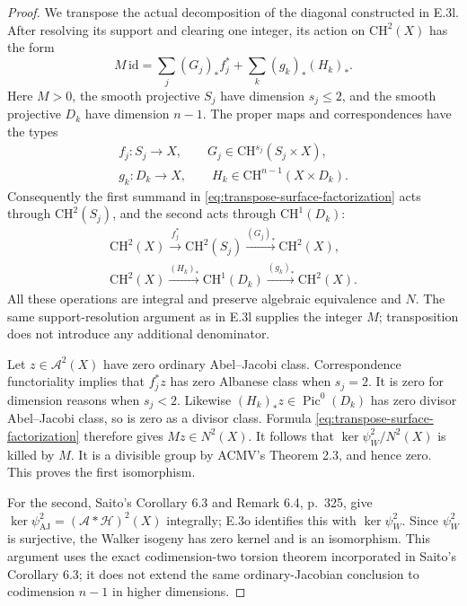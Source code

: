 \begin{proof}
We transpose the actual decomposition of the diagonal
constructed in E.3l. After resolving its support and clearing
one integer, its action on $\mathrm{CH}^2(X)$ has the form
\begin{equation}\label{eq:transpose-surface-factorization}
 M\,\mathrm{id}
   =\sum_j (G_j)_* f_j^*
          +\sum_k (g_k)_* (H_k)_* .
\end{equation}
Here $M>0$, the smooth projective $S_j$ have dimension
$s_j\le2$, and the smooth projective $D_k$ have dimension
$n-1$. The proper maps and correspondences have the types
\[
 \begin{gathered}
 f_j:S_j\longrightarrow X,\qquad
 G_j\in\mathrm{CH}^{s_j}(S_j\times X),\\
 g_k:D_k\longrightarrow X,\qquad
 H_k\in\mathrm{CH}^{n-1}(X\times D_k).
 \end{gathered}
\]
Consequently the first summand in
\eqref{eq:transpose-surface-factorization} acts through
$\mathrm{CH}^2(S_j)$, and the second acts through
$\mathrm{CH}^1(D_k)$:
\[
 \begin{gathered}
 \mathrm{CH}^2(X)\xrightarrow{f_j^*}
       \mathrm{CH}^2(S_j)\xrightarrow{(G_j)_*}\mathrm{CH}^2(X),\\
 \mathrm{CH}^2(X)\xrightarrow{(H_k)_*}
       \mathrm{CH}^1(D_k)\xrightarrow{(g_k)_*}\mathrm{CH}^2(X).
 \end{gathered}
\]
All these operations are integral and preserve algebraic
equivalence and $N$. The same support-resolution argument
as in E.3l supplies the integer $M$; transposition does not
introduce any additional denominator.

Let $z\in\mathcal A^2(X)$ have zero ordinary Abel--Jacobi
class. Correspondence functoriality implies that
$f_j^*z$ has zero Albanese class when $s_j=2$.
It is zero for dimension reasons when $s_j<2$.
Likewise $(H_k)_*z\in\operatorname{Pic}^0(D_k)$ has
zero divisor Abel--Jacobi class, so is zero as a
divisor class. Formula \eqref{eq:transpose-surface-factorization}
therefore gives $Mz\in N^2(X)$. It follows that
$\ker\psi_W^2/N^2(X)$ is killed by $M$.
It is a divisible group by ACMV's Theorem 2.3, and hence
zero. This proves the first isomorphism.

For the second, Saito's Corollary 6.3 and Remark 6.4,
p.~325, give
$\ker\psi_{\mathrm{AJ}}^2=(\mathcal A*\mathcal H)^2(X)$
integrally; E.3o identifies this with $\ker\psi_W^2$.
Since $\psi_W^2$ is surjective, the Walker isogeny has
zero kernel and is an isomorphism. This argument uses
the exact codimension-two torsion theorem incorporated
in Saito's Corollary 6.3; it does not extend the same
ordinary-Jacobian conclusion to codimension $n-1$ in
higher dimensions.
\end{proof}


